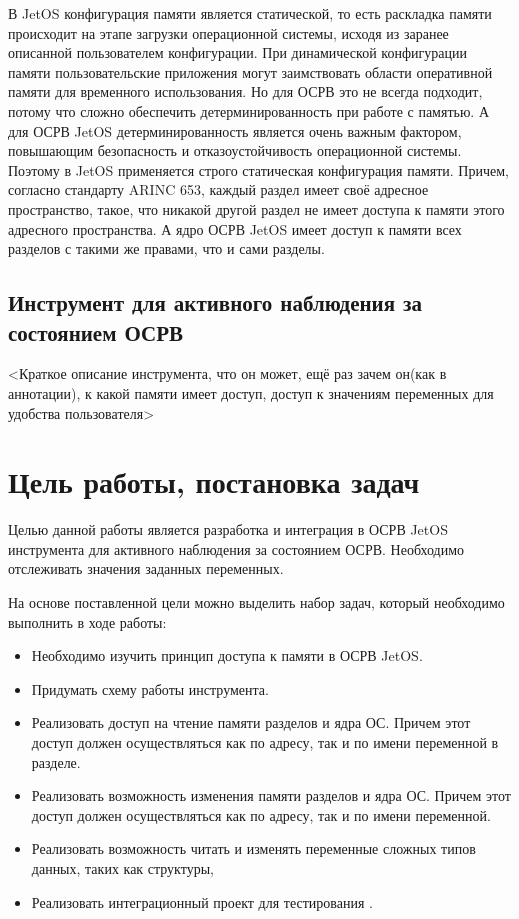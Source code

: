 \documentclass[oneside,senior,etd]{BYUPhys}
\begin{document}
В JetOS конфигурация памяти является статической, то есть раскладка памяти происходит
на этапе загрузки операционной системы, исходя из заранее описанной пользователем
конфигурации. При динамической конфигурации памяти пользовательские приложения могут
заимствовать области оперативной памяти для временного использования. Но для ОСРВ
это не всегда подходит, потому что сложно обеспечить детерминированность при работе
с памятью. А для ОСРВ JetOS детерминированность является очень важным фактором,
повышающим безопасность и отказоустойчивость операционной системы. Поэтому в JetOS
применяется строго статическая конфигурация памяти. Причем, согласно стандарту ARINC 653,
каждый раздел имеет своё адресное пространство, такое, что никакой другой раздел
не имеет доступа к памяти этого адресного пространства. А ядро ОСРВ JetOS
имеет доступ к памяти всех разделов с такими же правами, что и сами разделы.

\subsection{Инструмент для активного наблюдения за состоянием ОСРВ}

<Краткое описание инструмента, что он может, ещё раз зачем он(как в аннотации), к какой памяти имеет доступ,
доступ к значениям переменных для удобства пользователя>


\section{Цель работы, постановка задач}

Целью данной работы является разработка и интеграция в ОСРВ JetOS
инструмента для активного наблюдения за состоянием ОСРВ. Необходимо отслеживать значения заданных
переменных. 

На основе поставленной цели можно выделить набор задач, который необходимо выполнить в ходе работы:
\begin{itemize}
  \item Необходимо изучить принцип доступа к памяти в ОСРВ JetOS.
  \item Придумать схему работы инструмента.
  \item Реализовать доступ на чтение памяти разделов и ядра ОС. Причем этот доступ должен
осуществляться как по адресу, так и по имени переменной в разделе.
  \item Реализовать возможность изменения памяти разделов и ядра ОС. Причем этот доступ должен
осуществляться как по адресу, так и по имени переменной.
  \item Реализовать возможность читать и изменять переменные сложных типов данных, таких как структуры,
  \item Реализовать интеграционный проект для тестирования .
\end{itemize}
\end{document}
